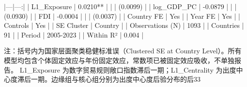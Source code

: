 |---|---:|
| L1_Exposure | 0.0210** |
|  | (0.0099) |
| log_GDP_PC | -0.0879 |
|  | (0.0930) |
| FDI | -0.0004 |
|  | (0.0037) |
| Country FE | Yes |
| Year FE | Yes |
| Controls | Yes |
| SE Cluster | Country |
| Observations (N) | 1093 |
| Countries | 91 |
| Period | 2005-2023 |
| Within R² | 0.004 |

注：括号内为国家层面聚类稳健标准误（Clustered SE at Country Level）。所有模型均包含个体固定效应与年份固定效应，常数项已被固定效应吸收，不单独报告。
L1_Exposure 为数字贸易规则敞口指数滞后一期；L1_Centrality 为出度中心度滞后一期。边缘组与核心组分别为出度中心度后验分布的后33%
